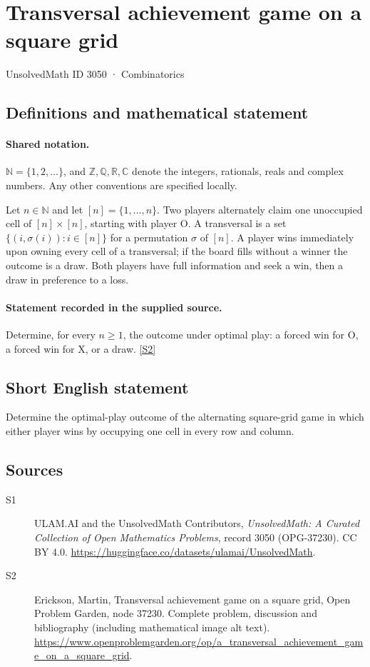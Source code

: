 \documentclass[11pt]{book}
\newcommand{\sref}[2]{\hyperlink{source:#1:#2}{[S#2]}}
\begin{document}
\setcounter{section}{3049}
\section{Transversal achievement game on a square grid}\label{3050}
{\small\sffamily UnsolvedMath ID 3050 · Combinatorics}
\subsection{Definitions and mathematical statement}

\paragraph{Shared notation.}$\mathbb N=\{1,2,\ldots\}$, and $\mathbb Z,\mathbb Q,\mathbb R,\mathbb C$ denote the integers, rationals, reals and complex numbers. Any other conventions are specified locally.


Let $n\in\mathbb N$ and let $[n]=\{1,\ldots,n\}$. Two players alternately claim one unoccupied cell of $[n]\times[n]$, starting with player O. A transversal is a set $\{(i,\sigma(i)):i\in[n]\}$ for a permutation $\sigma$ of $[n]$. A player wins immediately upon owning every cell of a transversal; if the board fills without a winner the outcome is a draw. Both players have full information and seek a win, then a draw in preference to a loss.
\paragraph{Statement recorded in the supplied source.}
Determine, for every $n\geq1$, the outcome under optimal play: a forced win for O, a forced win for X, or a draw. \sref{3050}{2}
\subsection{Short English statement}
Determine the optimal-play outcome of the alternating square-grid game in which either player wins by occupying one cell in every row and column.
\subsection{Sources}
\begin{description}
\item[\hypertarget{source:3050:1}{S1}] ULAM.AI and the UnsolvedMath Contributors, \emph{UnsolvedMath: A Curated Collection of Open Mathematics Problems}, record 3050 (OPG-37230). CC BY 4.0. \url{https://huggingface.co/datasets/ulamai/UnsolvedMath}.
\item[\hypertarget{source:3050:2}{S2}] Erickson, Martin, Transversal achievement game on a square grid, Open Problem Garden, node 37230. Complete problem, discussion and bibliography (including mathematical image alt text). \url{https://www.openproblemgarden.org/op/a_transversal_achievement_game_on_a_square_grid}.
\end{description}
\label{end:3050}
\end{document}
